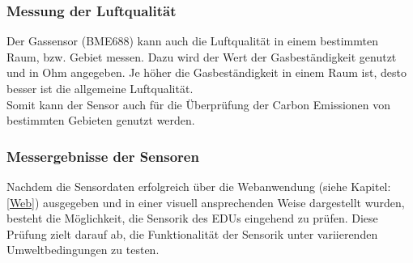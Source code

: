 \subsubsection{Messung der Luftqualität }
Der Gassensor (BME688) kann auch die Luftqualität in einem bestimmten Raum, bzw. Gebiet messen. Dazu wird der Wert der Gasbeständigkeit genutzt und in Ohm angegeben. Je höher die Gasbeständigkeit in einem Raum ist, desto besser ist die allgemeine Luftqualität.\\
\vspace{3mm}
Somit kann der Sensor auch für die Überprüfung der Carbon Emissionen von bestimmten Gebieten genutzt werden. 

\subsubsection{Messergebnisse der Sensoren}
Nachdem die Sensordaten erfolgreich über die Webanwendung (siehe Kapitel: \ref{Web}) ausgegeben und in einer visuell ansprechenden Weise dargestellt wurden, besteht die Möglichkeit, die Sensorik des EDUs eingehend zu prüfen. Diese Prüfung zielt darauf ab, die Funktionalität der Sensorik unter variierenden Umweltbedingungen zu testen. 


